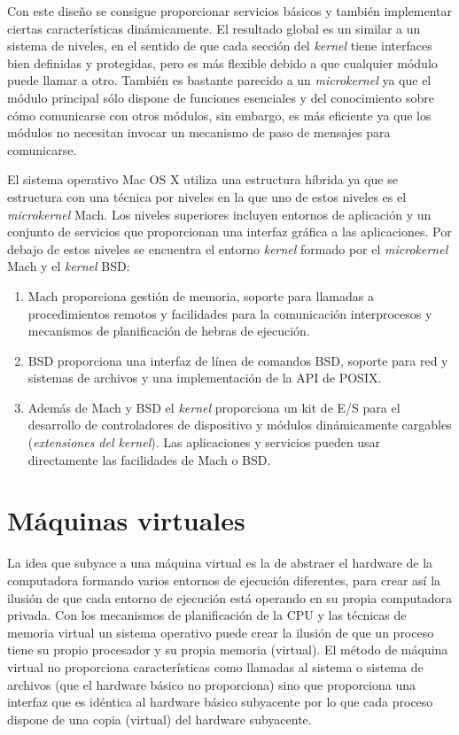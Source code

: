 \documentclass[10pt,a4paper,spanish]{report}
\begin{document}
  \noindent
  Con este diseño se consigue proporcionar servicios básicos y también implementar ciertas características dinámicamente. El resultado global es un similar a un sistema de niveles, en el sentido de que cada sección del \textit{kernel} tiene interfaces bien definidas y protegidas, pero es más flexible debido a que cualquier módulo puede llamar a otro. También es bastante parecido a un \textit{microkernel} ya que el módulo principal sólo dispone de funciones esenciales y del conocimiento sobre cómo comunicarse con otros módulos, sin embargo, es más eficiente ya que los módulos no necesitan invocar un mecanismo de paso de mensajes para comunicarse.

  \noindent
  El sistema operativo Mac OS X utiliza una estructura híbrida ya que se estructura con una técnica por niveles en la que uno de estos niveles es el \textit{microkernel} Mach. Los niveles superiores incluyen entornos de aplicación y un conjunto de servicios que proporcionan una interfaz gráfica a las aplicaciones. Por debajo de estos niveles se encuentra el entorno \textit{kernel} formado por el \textit{microkernel} Mach y el \textit{kernel} BSD:
  \begin{enumerate}
    \item Mach proporciona gestión de memoria, soporte para llamadas a procedimientos remotos y facilidades para la comunicación interprocesos y mecanismos de planificación de hebras de ejecución.
    \item BSD proporciona una interfaz de línea de comandos BSD, soporte para red y sistemas de archivos y una implementación de la API de POSIX.
    \item Además de Mach y BSD el \textit{kernel} proporciona un kit de E/S para el desarrollo de controladores de dispositivo y módulos dinámicamente cargables (\textit{extensiones del kernel}). Las aplicaciones y servicios pueden usar directamente las facilidades de Mach o BSD.
  \end{enumerate}


  \section{Máquinas virtuales}
  \noindent
  La idea que subyace a una máquina virtual es la de abstraer el hardware de la computadora formando varios entornos de ejecución diferentes, para crear así la ilusión de que cada entorno de ejecución está operando en su propia computadora privada. Con los mecanismos de planificación de la CPU y las técnicas de memoria virtual un sistema operativo puede crear la ilusión de que un proceso tiene su propio procesador y su propia memoria (virtual). El método de máquina virtual no proporciona características como llamadas al sistema o sistema de archivos (que el hardware básico no proporciona) sino que proporciona una interfaz que es idéntica al hardware básico subyacente por lo que cada proceso dispone de una copia (virtual) del hardware subyacente.
\end{document}
